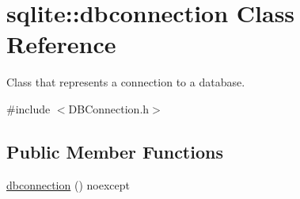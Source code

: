 \hypertarget{a00004}{\section{sqlite\-:\-:dbconnection Class Reference}
\label{a00004}
}


Class that represents a connection to a database.  




{\ttfamily \#include $<$D\-B\-Connection.\-h$>$}

\subsection*{Public Member Functions}
\begin{DoxyCompactItemize}
\item 
\hypertarget{a00004_a1cfe02390c4b08e78787120edaed6ab7}{\hyperlink{a00004_a1cfe02390c4b08e78787120edaed6ab7}{dbconnection} () noexcept}\label{a00004_a1cfe02390c4b08e78787120edaed6ab7}


\end{DoxyCompactItemize}
